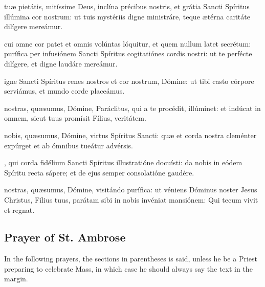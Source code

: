{\oremuslatin
{} tu{\ae} pietátis, mitíssime Deus, inclína précibus nostris, et grátia Sancti Spíritus illúmina cor nostrum: ut tuis mystériis digne ministráre, teque {\ae}térna caritáte dilígere mereámur.


 cui omne cor patet et omnis volúntas lóquitur, et quem nullum latet secrétum: purífica per infusiónem Sancti Spíritus cogitatiónes cordis nostri: ut te perfécte dilígere, et digne laudáre mereámur.


 igne Sancti Spíritus renes nostros et cor nostrum, Dómine: ut tibi casto córpore serviámus, et mundo corde placeámus.


 nostras, qu{\ae}sumus, Dómine, Paráclitus, qui a te procédit, illúminet: et indúcat in omnem, sicut tuus promísit Fílius, veritátem.


 nobis, qu{\ae}sumus, Dómine, virtus Spíritus Sancti: qu{\ae} et corda nostra cleménter expúrget et ab ómnibus tueátur advérsis.

\newpage
{}, qui corda fidélium Sancti Spíritus illustratióne docuísti: da nobis in eódem Spíritu recta sápere; et de ejus semper consolatióne gaudére.


 nostras, qu{\ae}sumus, Dómine, visitándo purífica: ut véniens Dóminus noster Jesus Christus, Fílius tuus, parátam sibi in nobis invéniat mansiónem: Qui tecum vivit et regnat.}

\subsection{Prayer of St. Ambrose}
\begin{rubric}
	In the following prayers, the sections in parentheses is said, unless he be a Priest preparing to celebrate Mass, in which case he should always say the text in the margin.
\end{rubric}
